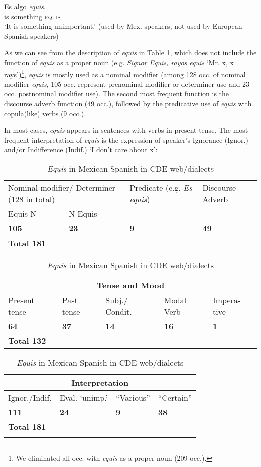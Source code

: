 \documentclass[output=paper
,modfonts
,nonflat]{langsci/langscibook}
\begin{document}
\ea
\gll Es algo \textit{equis}.\\
is something \textsc{equis}\\
\glt ‘It is something unimportant.’
(used by Mex. speakers, not used by European Spanish speakers)
\z

As we can see from the description of \textit{equis} in Table 1, which does not include the function of \textit{equis} as a proper noun (e.g. \textit{Signor Equis, rayos equis} ‘Mr. x, x rays’)\footnote{We eliminated all occ. with \textit{equis} as a proper noun (209 occ.).}, \textit{equis} is mostly used as a nominal modifier (among 128 occ. of nominal modifier \textit{equis}, 105 occ. represent prenominal modifier or determiner use and 23 occ. postnominal modifier use). The second most frequent function is the discourse adverb function (49 occ.), followed by the predicative use of \textit{equis} with copula(like) verbs (9 occ.). 

In most cases, \textit{equis} appears in sentences with verbs in present tense. The most frequent interpretation of \textit{equis} is the expression of speaker’s Ignorance (Ignor.) and/or Indifference (Indif.) ‘I don’t care about x’:

\begin{table}\small
\caption{\textit{Equis} in Mexican Spanish in CDE web/dialects}
\label{tab:1:Equis MexSp. CDE}
 \begin{tabularx}{8cm}{XXXX} 
  \lsptoprule
   \multicolumn{4}{c}{\textbf{Syntactic Function}}\\ 
  \midrule
  \multicolumn{2}{p{3cm}}{\raggedright Nominal modifier/ Determiner (128 in total)} & \raggedright Predicate (e.g. \textit{Es equis})  &    Discourse Adverb\\
  \midrule
  Equis N  &   N Equis &  & \\
  \midrule
  \textbf{105}  &   \textbf{23} &   \textbf{9} &    \textbf{49}\\
  \midrule
  \multicolumn{4}{l}{\textbf{Total 181}}\\
  \bottomrule
 \end{tabularx}
 \begin{tabularx}{8cm}{XXXXX} 
   \multicolumn{5}{c}{\textbf{Tense and Mood}}\\ 
  \midrule
 Present tense & Past tense & Subj./ Condit. & Modal Verb & Impera-tive\\
  \midrule
  \textbf{64} & \textbf{37}  &   \textbf{14} &   \textbf{16} &    \textbf{1}\\
  \midrule
  \multicolumn{5}{l}{\textbf{Total 132}}\\
  \bottomrule
 \end{tabularx}
 \begin{tabularx}{8cm}{XXXX} 
   \multicolumn{4}{c}{\textbf{Interpretation}}\\ 
  \midrule
 Ignor./Indif. & Eval. ‘unimp.’ & ``Various'' & ``Certain''\\
  \midrule
  \textbf{111} & \textbf{24}  &   \textbf{9} &   \textbf{38}\\
  \midrule
  \multicolumn{4}{l}{\textbf{Total 181}}\\
  \lspbottomrule
 \end{tabularx}
\end{table}
\end{document}
